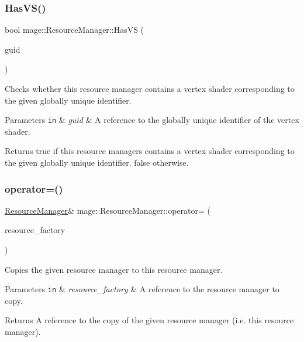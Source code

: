 \subsubsection{\texorpdfstring{Has\+V\+S()}{HasVS()}}
{\footnotesize\ttfamily bool mage\+::\+Resource\+Manager\+::\+Has\+VS (\begin{DoxyParamCaption}\item[{const wstring \&}]{guid }\end{DoxyParamCaption})\hspace{0.3cm}{\ttfamily [noexcept]}}

Checks whether this resource manager contains a vertex shader corresponding to the given globally unique identifier.


\begin{DoxyParams}[1]{Parameters}
\mbox{\tt in}  & {\em guid} & A reference to the globally unique identifier of the vertex shader. \\
\hline
\end{DoxyParams}
\begin{DoxyReturn}{Returns}
{\ttfamily true} if this resource managers contains a vertex shader corresponding to the given globally unique identifier. {\ttfamily false} otherwise. 
\end{DoxyReturn}
\hypertarget{classmage_1_1_resource_manager_a20dccd5bdf541990ec4db7819adc6cdb}{}\label{classmage_1_1_resource_manager_a20dccd5bdf541990ec4db7819adc6cdb} 
\subsubsection{\texorpdfstring{operator=()}{operator=()}\hspace{0.1cm}{\footnotesize\ttfamily [1/2]}}
{\footnotesize\ttfamily \hyperlink{classmage_1_1_resource_manager}{Resource\+Manager}\& mage\+::\+Resource\+Manager\+::operator= (\begin{DoxyParamCaption}\item[{const \hyperlink{classmage_1_1_resource_manager}{Resource\+Manager} \&}]{resource\+\_\+factory }\end{DoxyParamCaption})\hspace{0.3cm}{\ttfamily [delete]}}

Copies the given resource manager to this resource manager.


\begin{DoxyParams}[1]{Parameters}
\mbox{\tt in}  & {\em resource\+\_\+factory} & A reference to the resource manager to copy. \\
\hline
\end{DoxyParams}
\begin{DoxyReturn}{Returns}
A reference to the copy of the given resource manager (i.\+e. this resource manager). 
\end{DoxyReturn}
\hypertarget{classmage_1_1_resource_manager_a0a418c5753af2b4a0a868801f3145f0a}{}\label{classmage_1_1_resource_manager_a0a418c5753af2b4a0a868801f3145f0a} 
